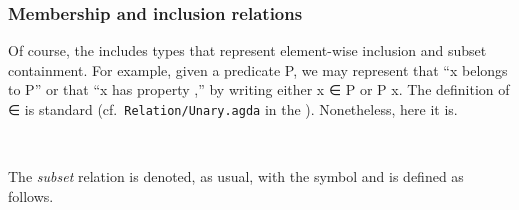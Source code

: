 \subsubsection{Membership and inclusion relations}\label{membership-and-inclusion-relations}

Of course, the \ualib includes types that represent element-wise inclusion and subset containment. For example, given a predicate \af P, we may represent that  ``\ab x belongs to \af P'' or that ``\ab x has property ,'' by writing either \ab x \af ∈ \af P or \af P \ab x.  The definition of \af ∈ is standard (cf.~\texttt{Relation/Unary.agda} in the \agdastdlib). Nonetheless, here it is.
\ccpad
\begin{code}%
\>[1]\AgdaSpace{}%
\AgdaSymbol{:}\AgdaSpace{}%
\AgdaSpace{}%
\AgdaSpace{}%
\AgdaSpace{}%
\AgdaSpace{}%
\AgdaSpace{}%
\AgdaSpace{}%
%
\<%
\\
%
\>[1]\AgdaSpace{}%
\AgdaSpace{}%
\AgdaSpace{}%
\AgdaSymbol{=}\AgdaSpace{}%
\AgdaSpace{}%
\<%
\end{code}
\ccpad
The \textit{subset} relation is denoted, as usual, with the  symbol and is defined as follows.
\ccpad
\begin{code}%
\>[0]\AgdaSpace{}%
\AgdaSymbol{:}\AgdaSpace{}%
\AgdaSpace{}%
\AgdaSpace{}%
\AgdaSpace{}%
\AgdaSpace{}%
\AgdaSpace{}%
\AgdaSpace{}%
\AgdaSpace{}%
\AgdaSpace{}%
\AgdaSpace{}%
\AgdaSpace{}%
\AgdaSpace{}%
\AgdaSpace{}%
%
\<%
\\
\>[0]\AgdaSpace{}%
\AgdaSpace{}%
\AgdaSpace{}%
\AgdaSymbol{=}\AgdaSpace{}%
\AgdaSpace{}%
\AgdaSymbol{\{}\AgdaSymbol{\}}\AgdaSpace{}%
\AgdaSpace{}%
\AgdaSpace{}%
\AgdaSpace{}%
\AgdaSpace{}%
\AgdaSpace{}%
\AgdaSpace{}%
\AgdaSpace{}%
\<%
\end{code}


